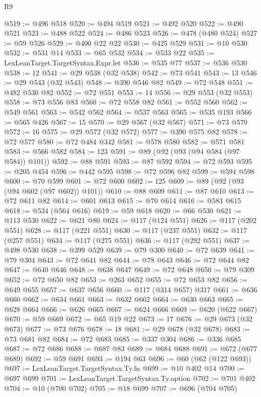 \begin{lexlean}{R9}
\begin{coremodule}
@519 := @496 @518
@520 := @494 @519
@521 := @492 @520
@522 := @490 @521
@523 := @488 @522
@524 := @486 @523
@526 := @478 (@480 @524)
@527 := @59 @526
@529 := @400 @22 @22
@530 := @425 @529
@531 := @10 @530
@532 := @531 @14
@533 := @65 @532
@534 := @533 @22
@535 := LexLeanTarget.TargetSyntax.Expr.let
@536 := @535 @77
@537 := @536 @530
@538 := 12
@541 := @29 @538 (@32 @538)
@542 := @73 @541
@543 := 13
@546 := @29 @543 (@32 @543)
@548 := @390 @546 @82
@549 := @72 @548
@551 := @482 @530 @82
@552 := @72 @551
@553 := 14
@556 := @29 @553 (@32 @553)
@558 := @73 @556 @83
@560 := @72 @558 @82
@561 := @552 @560
@562 := @549 @561
@563 := @542 @562
@564 := @537 @563
@565 := @535 @193
@566 := @565 @426
@567 := 15
@570 := @29 @567 (@32 @567)
@571 := @73 @570
@572 := 16
@575 := @29 @572 (@32 @572)
@577 := @390 @575 @82
@578 := @72 @577
@580 := @72 @484 @342
@581 := @578 @580
@582 := @571 @581
@583 := @566 @582
@584 := 123
@591 := @89 (@92 (@93 (@94 @584 (@97 @584)) @101))
@592 := @88 @591
@593 := @87 @592
@594 := @72 @593
@595 := @205 @454
@596 := @442 @595
@598 := @72 @596 @82
@599 := @594 @598
@600 := @70 @599
@601 := @72 @600
@602 := 125
@609 := @89 (@92 (@93 (@94 @602 (@97 @602)) @101))
@610 := @88 @609
@611 := @87 @610
@613 := @72 @611 @82
@614 := @601 @613
@615 := @70 @614
@616 := @583 @615
@618 := @534 (@564 @616)
@619 := @59 @618
@620 := @66 @530
@621 := @113 @530
@622 := @621 @80
@624 := @117 (@124 @551)
@626 := @117 (@202 @551)
@628 := @117 (@221 @551)
@630 := @117 (@237 @551)
@632 := @117 (@257 @551)
@634 := @117 (@275 @551)
@636 := @117 (@292 @551)
@637 := @498 @530
@638 := @399 @529
@639 := @79 @300
@640 := @72 @639
@641 := @79 @304
@643 := @72 @641 @82
@644 := @78 @643
@646 := @72 @644 @82
@647 := @640 @646
@648 := @638 @647
@649 := @72 @648
@650 := @79 @309
@652 := @72 @650 @82
@653 := @263 @652
@655 := @72 @653 @82
@656 := @649 @655
@657 := @637 @656
@660 := @117 (@314 @657) @317
@661 := @636 @660
@662 := @634 @661
@663 := @632 @662
@664 := @630 @663
@665 := @628 @664
@666 := @626 @665
@667 := @624 @666
@669 := @620 (@622 @667)
@670 := @59 @669
@672 := @65 @19 @22
@673 := 17
@676 := @29 @673 (@32 @673)
@677 := @73 @676
@678 := 18
@681 := @29 @678 (@32 @678)
@683 := @73 @681 @82
@684 := @72 @683
@685 := @337 @304
@686 := @336 @685
@687 := @72 @686
@688 := @687 @83
@689 := @684 @688
@691 := @672 (@677 @689)
@692 := @59 @691
@693 := @194 @63
@696 := @60 (@62 (@122 @693))
@697 := LexLeanTarget.TargetSyntax.Ty.fn
@699 := @10 @402 @14
@700 := @697 @699
@701 := LexLeanTarget.TargetSyntax.Ty.option
@702 := @701 @402
@704 := @10 (@700 @702)
@705 := @18 @699
@707 := @696 (@704 @705)

\end{coremodule}
\end{lexlean}

